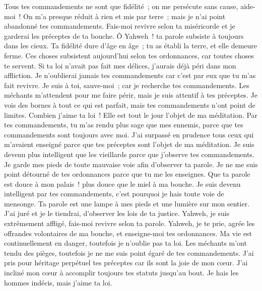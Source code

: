 \begin{multicols}{2}
Tous tes commandements ne sont que fidélité~; on me persécute sans cause, aide-moi~!
On m'a presque réduit à rien et mis par terre~; mais je n'ai point abandonné tes commandements.
Fais-moi revivre selon ta miséricorde et je garderai les préceptes de ta bouche.
 Ô Yahweh~! ta parole subsiste à toujours dans les cieux.
Ta fidélité dure d'âge en âge~; tu as établi la terre, et elle demeure ferme.
Ces choses subsistent aujourd'hui selon tes ordonnances, car toutes choses te servent.
Si ta loi n'avait pas fait mes délices, j'aurais déjà péri dans mon affliction.
Je n'oublierai jamais tes commandements car c'est par eux que tu m'as fait revivre.
Je suis à toi, sauve-moi~; car je recherche tes commandements.
Les méchants m'attendent pour me faire périr, mais je suis attentif à tes préceptes.
Je vois des bornes à tout ce qui est parfait, mais tes commandements n'ont point de limites.
 Combien j'aime ta loi~! Elle est tout le jour l'objet de ma méditation.
Par tes commandements, tu m'as rendu plus sage que mes ennemis, parce que tes commandements sont toujours avec moi.
J'ai surpassé en prudence tous ceux qui m'avaient enseigné parce que tes préceptes sont l'objet de ma méditation.
Je suis devenu plus intelligent que les vieillards parce que j'observe tes commandements.
Je garde mes pieds de toute mauvaise voie afin d'observer ta parole.
Je ne me suis point détourné de tes ordonnances parce que tu me les enseignes.
Que ta parole est douce à mon palais~! plus douce que le miel à ma bouche.
Je suis devenu intelligent par tes commandements, c'est pourquoi je hais toute voie de mensonge.
 Ta parole est une lampe à mes pieds et une lumière sur mon sentier.
J'ai juré et je le tiendrai, d'observer les lois de ta justice.
Yahweh, je suis extrêmement affligé, fais-moi revivre selon ta parole.
Yahweh, je te prie, agrée les offrandes volontaires de ma bouche, et enseigne-moi tes ordonnances.
Ma vie est continuellement en danger, toutefois je n'oublie pas ta loi.
Les méchants m'ont tendu des pièges, toutefois je ne me suis point égaré de tes commandements.
J'ai pris pour héritage perpétuel tes préceptes car ils sont la joie de mon cœur.
J'ai incliné mon cœur à accomplir toujours tes statuts jusqu'au bout.
 Je hais les hommes indécis, mais j'aime ta loi.

\end{multicols}
